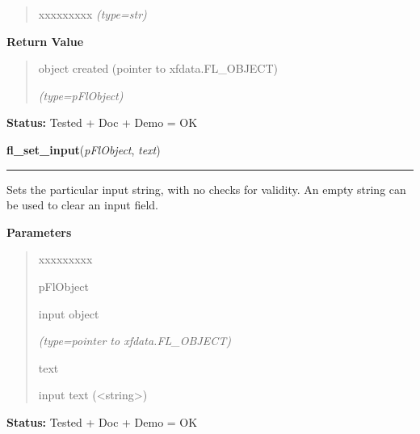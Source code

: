 \begin{boxedminipage}{\funcwidth}
\begin{quote}
\begin{Ventry}{xxxxxxxxx}
            {\it (type=str)}

        \end{Ventry}

      \end{quote}

      \textbf{Return Value}
    \vspace{-1ex}

      \begin{quote}
      object created (pointer to xfdata.FL\_OBJECT)

      {\it (type=pFlObject)}

      \end{quote}

\textbf{Status:} Tested + Doc + Demo = OK



    \end{boxedminipage}

    \label{xformslib:flinput:fl_set_input}

    \vspace{0.5ex}

\hspace{.8\funcindent}\begin{boxedminipage}{\funcwidth}

    \raggedright \textbf{fl\_set\_input}(\textit{pFlObject}, \textit{text})

    \vspace{-1.5ex}

    \rule{\textwidth}{0.5\fboxrule}
\setlength{\parskip}{2ex}
    Sets the particular input string, with no checks for validity. An empty
    string can be used to clear an input field.

\setlength{\parskip}{1ex}
      \textbf{Parameters}
      \vspace{-1ex}

      \begin{quote}
        \begin{Ventry}{xxxxxxxxx}

          \item[pFlObject]

          input object

            {\it (type=pointer to xfdata.FL\_OBJECT)}

          \item[text]

          input text ({\textless}string{\textgreater})

        \end{Ventry}

      \end{quote}

\textbf{Status:} Tested + Doc + Demo = OK



    \end{boxedminipage}

